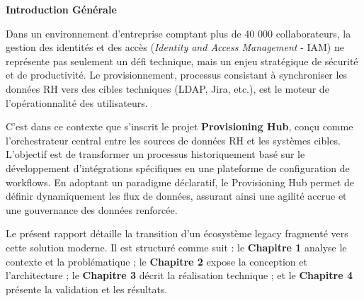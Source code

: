\documentclass[12pt,a4paper]{report}
\begin{document}


\begin{center}
    {\fontsize{24}{28}\selectfont \textbf{Introduction Générale}}
\end{center}
\label{chap:intro_gen}
\vspace{1cm}

Dans un environnement d'entreprise comptant plus de 40 000 collaborateurs, la gestion des identités et des accès (\textit{Identity and Access Management} - IAM) ne représente pas seulement un défi technique, mais un enjeu stratégique de sécurité et de productivité. Le provisionnement, processus consistant à synchroniser les données RH vers des cibles techniques (LDAP, Jira, etc.), est le moteur de l'opérationnalité des utilisateurs.

C'est dans ce contexte que s'inscrit le projet \textbf{Provisioning Hub}, conçu comme l'orchestrateur central entre les sources de données RH et les systèmes cibles. L'objectif est de transformer un processus historiquement basé sur le développement d'intégrations spécifiques en une plateforme de configuration de workflows. En adoptant un paradigme déclaratif, le Provisioning Hub permet de définir dynamiquement les flux de données, assurant ainsi une agilité accrue et une gouvernance des données renforcée.

Le présent rapport détaille la transition d'un écosystème legacy fragmenté vers cette solution moderne. Il est structuré comme suit : le \textbf{Chapitre 1} analyse le contexte et la problématique ; le \textbf{Chapitre 2} expose la conception et l'architecture ; le \textbf{Chapitre 3} décrit la réalisation technique ; et le \textbf{Chapitre 4} présente la validation et les résultats.






\end{document}
